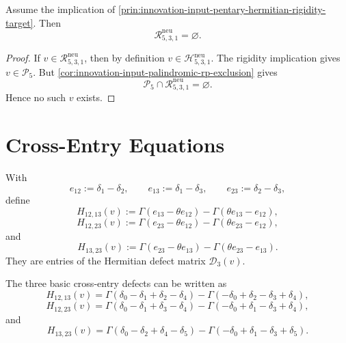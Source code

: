 \begin{theorem}
\label{thm:innovation-input-hermitian-rigidity-empties-pentary-rp-locus}
Assume the implication of
\autoref{prin:innovation-input-pentary-hermitian-rigidity-target}. Then
$$
\mathcal R_{5,3,1}^{\mathrm{neu}}=\varnothing.
$$
\end{theorem}

\begin{proof}
If $v\in\mathcal R_{5,3,1}^{\mathrm{neu}}$, then by definition
$v\in\mathcal H_{5,3,1}^{\mathrm{neu}}$. The rigidity implication gives
$v\in\mathcal P_5$. But
\autoref{cor:innovation-input-palindromic-rp-exclusion} gives
$$
\mathcal P_5\cap\mathcal R_{5,3,1}^{\mathrm{neu}}=\varnothing.
$$
Hence no such $v$ exists.
\end{proof}

\section{Cross-Entry Equations}
\label{sec:innovation-input-cross-entry-equations}

\begin{definition}
\label{def:innovation-input-basic-cross-entry-defects}
With
$$
e_{12}:=\delta_1-\delta_2,
\qquad
e_{13}:=\delta_1-\delta_3,
\qquad
e_{23}:=\delta_2-\delta_3,
$$
define
$$
H_{12,13}(v)
:=
\Gamma(e_{13}-\theta e_{12})
-
\Gamma(\theta e_{13}-e_{12}),
$$
$$
H_{12,23}(v)
:=
\Gamma(e_{23}-\theta e_{12})
-
\Gamma(\theta e_{23}-e_{12}),
$$
and
$$
H_{13,23}(v)
:=
\Gamma(e_{23}-\theta e_{13})
-
\Gamma(\theta e_{23}-e_{13}).
$$
They are entries of the Hermitian defect matrix
$\mathcal D_3(v)$.
\end{definition}

\begin{proposition}
\label{prop:innovation-input-cross-entry-normalized-blocks}
The three basic cross-entry defects can be written as
$$
H_{12,13}(v)
=
\Gamma(\delta_0-\delta_1+\delta_2-\delta_4)
-
\Gamma(-\delta_0+\delta_2-\delta_3+\delta_4),
$$
$$
H_{12,23}(v)
=
\Gamma(\delta_0-\delta_1+\delta_3-\delta_4)
-
\Gamma(-\delta_0+\delta_1-\delta_3+\delta_4),
$$
and
$$
H_{13,23}(v)
=
\Gamma(\delta_0-\delta_2+\delta_4-\delta_5)
-
\Gamma(-\delta_0+\delta_1-\delta_3+\delta_5).
$$
\end{proposition}


